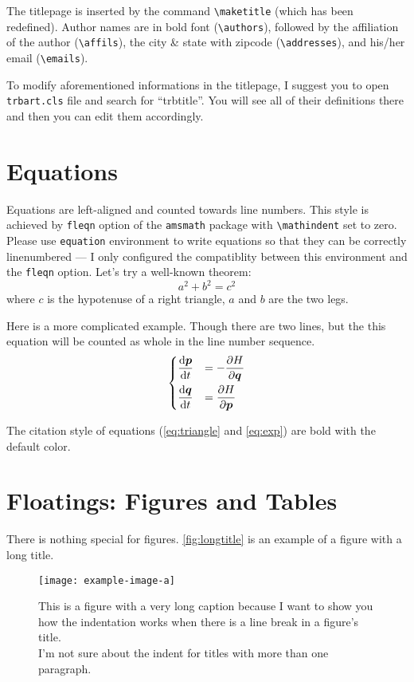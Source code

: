 \documentclass[12pt]{trbart}
\begin{document}
The titlepage is inserted by the command \verb+\maketitle+ (which has been redefined). Author names are in bold font (\verb+\authors+), followed by the affiliation of the author (\verb+\affils+), the city \& state with zipcode (\verb+\addresses+), and his/her email (\verb+\emails+). 

To modify aforementioned informations in the titlepage, I suggest you to open \texttt{trbart.cls} file and search for ``trbtitle''. You will see all of their definitions there and then you can edit them accordingly. 


\section{Equations}
Equations are left-aligned and counted towards line numbers. This style is achieved by \texttt{fleqn} option of the \texttt{amsmath} package with \verb+\mathindent+ set to zero. Please use \texttt{equation} environment to write equations so that they can be correctly linenumbered --- I only configured the compatiblity between this environment and the \texttt{fleqn} option. Let's try a well-known theorem:
\begin{equation}\label{eq:triangle}
    a^2 + b^2 = c^2
\end{equation}
where \(c\) is the hypotenuse of a right triangle, \(a\) and \(b\) are the two legs.

Here is a more complicated example. Though there are two lines, but the this equation will be counted as whole in the line number sequence.
\begin{equation}\label{eq:exp}
\begin{dcases}
    \frac{\mathop{}\negthinspace\mathrm{d} \boldsymbol{p}}{\mathop{}\negthinspace\mathrm{d} t} &= -\frac{\partial H}{\partial \boldsymbol{q}} \\
    \frac{\mathop{}\negthinspace\mathrm{d} \boldsymbol{q}}{\mathop{}\negthinspace\mathrm{d} t} &= \frac{\partial H}{\partial \boldsymbol{p}}
\end{dcases} 
\end{equation}

The citation style of equations (\autoref{eq:triangle} and \autoref{eq:exp}) are bold with the default color.

\section{Floatings: Figures and Tables}
There is nothing special for figures. \autoref{fig:longtitle} is an example of a figure with a long title.
\begin{figure}[!hbt]
    \centering
    \texttt{[image: example-image-a]}
    \caption{This is a figure with a very long caption because I want to show you how the indentation works when there is a line break in a figure's title.\\ I'm not sure about the indent for titles with more than one paragraph.}\label{fig:longtitle}
\end{figure}
\end{document}
